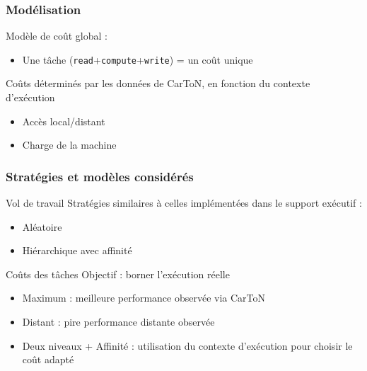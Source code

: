 \documentclass[xcolor={usenames,dvipsnames,svgnames,table}, aspectratio=43]{beamer}
\begin{document}
\begin{frame}[fragile]
  \frametitle{Modélisation}

  Modèle de coût global :

  \begin{itemize}
    \item Une tâche (\verb/read/+\verb/compute/+\verb/write/) = un coût unique
  \end{itemize}

  Coûts déterminés par les données de CarToN, en fonction du contexte d'exécution
  \begin{itemize}
    \item Accès local/distant
    \item Charge de la machine
  \end{itemize}

\end{frame}

\begin{frame}
  \frametitle{Stratégies et modèles considérés}

  \begin{block}{Vol de travail}
    Stratégies similaires à celles implémentées dans le support exécutif :
    \begin{itemize}
      \item Aléatoire
      \item Hiérarchique avec affinité
    \end{itemize}
  \end{block}

  \begin{block}{Coûts des tâches}
    Objectif : borner l'exécution réelle
    \begin{itemize}
      \item Maximum : meilleure performance observée via CarToN
      \item Distant : pire performance distante observée
      \item Deux niveaux + Affinité : utilisation du contexte d'exécution pour choisir le coût adapté
    \end{itemize}
  \end{block}

\end{frame}
\end{document}

